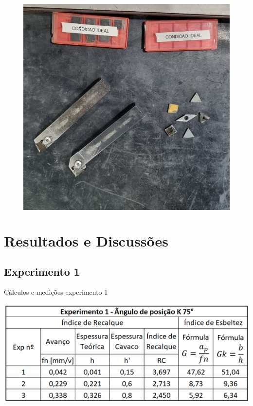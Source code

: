 \documentclass[deposito, acronym, symbols]{fei}
\begin{document}
\begin{figure}[!htp]
\begin{minipage}{0.4\textwidth}
    \includegraphics[width=1\linewidth]{Imagens/Exp03_ferramentas.jpeg}
    \label{fig:Ferramenta}
  \end{minipage}
\end{figure}

\chapter{Resultados e Discussões}

\section{Experimento 1}

 \begin{table}[!htb]
 \centering
    \caption{Cálculos e medições experimento 1}
    \includegraphics[width=0.8\linewidth]{Imagens/exp03_exp1dados.png}
    \label{tab:exp1dados}
 \end{table}
\end{document}
